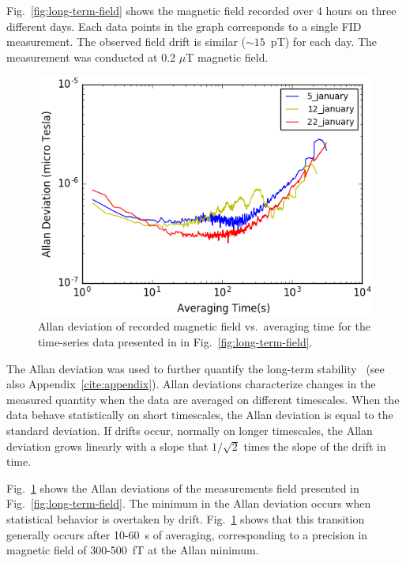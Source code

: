 Fig.~\ref{fig:long-term-field} shows the magnetic field recorded over
4 hours on three different days. Each data points in the graph
corresponds to a single FID measurement.  The observed field drift is
similar ($\sim 15$~pT) for each day.  The measurement was conducted at
0.2 $\mu$T magnetic field.

\begin{figure}%
\centering\includegraphics[width=0.8\linewidth]{figures/field_3_day_allan.png}
\caption{Allan deviation of recorded magnetic field vs.~averaging time
  for the time-series data presented in in
  Fig.~\ref{fig:long-term-field}.\label{fig:allan_deviation}}
\end{figure}

The Allan deviation was used to further quantify the long-term
stability~\cite{doe:website2} (see also Appendix~\ref{cite:appendix}).
Allan deviations characterize changes in the measured quantity when
the data are averaged on different timescales.  When the data behave
statistically on short timescales, the Allan deviation is equal to the
standard deviation.  If drifts occur, normally on longer timescales,
the Allan deviation grows linearly with a slope that $1/\sqrt{2}$
times the slope of the drift in time.

Fig.~\ref{fig:allan_deviation} shows the Allan deviations of the
measurements field presented in Fig.~\ref{fig:long-term-field}.  The
minimum in the Allan deviation occurs when statistical behavior is
overtaken by drift.  Fig.~\ref{fig:allan_deviation} shows that this
transition generally occurs after 10-60~s of averaging, corresponding
to a precision in magnetic field of 300-500~fT at the Allan minimum.


